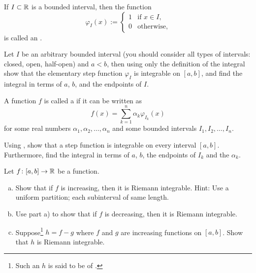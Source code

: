\begin{exnote}
If $I \subset {\mathbb{R}}$ is a bounded interval, then
the function
\begin{equation*}
\varphi_I(x) :=
\begin{cases}
1 & \text{if } x \in I, \\
0 & \text{otherwise,}
\end{cases}
\end{equation*}
is called an \emph{}.
\end{exnote}

\begin{exercise} \label{exercise:stepfunctionintegrable}
Let $I$ be an arbitrary bounded interval (you should consider all types
of intervals: closed, open, half-open) and $a < b$, then
using only the definition of the integral
show that
the elementary step function $\varphi_I$ is integrable
on $[a,b]$, and find the integral in terms of $a$, $b$, and the
endpoints of $I$.
\end{exercise}

\begin{exnote}
A function $f$ is called a
\emph{} if it
can be written as
\begin{equation*}
f(x) = \sum_{k=1}^n \alpha_k \varphi_{I_k} (x)
\end{equation*}
for some real numbers $\alpha_1,\alpha_2, \ldots, \alpha_n$
and some bounded intervals $I_1,I_2,\ldots,I_n$.
\end{exnote}

\begin{exercise}
Using , show that a step function is integrable
on every interval $[a,b]$.  Furthermore, find the integral in terms of
$a$, $b$, the endpoints of $I_k$ and the $\alpha_k$.
\end{exercise}

\begin{exercise}
\label{exercise:boundedvariationintegrable}
Let $f \colon [a,b] \to {\mathbb{R}}$ be a function.
\begin{enumerate}[a)]
\item
Show that if $f$ is increasing, then it is Riemann
integrable.  Hint: Use a uniform partition; each subinterval of same length.
\item
Use part a) to show that if $f$ is decreasing, then it is Riemann
integrable.
\item
Suppose\footnote{Such an $h$ is said to be of \emph{}.}
$h = f-g$ where $f$ and $g$ are increasing
functions on $[a,b]$.  Show that $h$ is Riemann integrable.
\end{enumerate}
\end{exercise}

